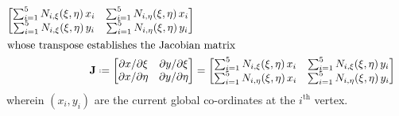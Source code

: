 \begin{subequations}
\begin{align}
\begin{bmatrix}
	\sum\nolimits_{i=1}^5 N_{i,\xi} (\xi,\eta) \, x_i & \sum\nolimits_{i=1}^5 N_{i,\eta} (\xi,\eta) \, x_i \\
	\sum\nolimits_{i=1}^5 N_{i,\xi} (\xi,\eta) \, y_i & \sum\nolimits_{i=1}^5 N_{i,\eta} (\xi,\eta) \, y_i
	\end{bmatrix}
	\label{currentGradients} \\
    \intertext{whose transpose establishes the Jacobian matrix}
    \mathbf{J} \defeq \begin{bmatrix}
    \partial x / \partial\xi & \partial y / \partial\xi \\
    \partial x / \partial\eta & \partial y / \partial\eta
    \end{bmatrix} & = 
    \begin{bmatrix}
    \sum\nolimits_{i=1}^5 N_{i,\xi} (\xi,\eta) \, x_i & \sum\nolimits_{i=1}^5 N_{i,\xi} (\xi,\eta) \, y_i \\
    \sum\nolimits_{i=1}^5 N_{i,\eta} (\xi,\eta) \, x_i & \sum\nolimits_{i=1}^5 N_{i,\eta} (\xi,\eta) \, y_i
    \end{bmatrix}
    \label{JacobianMtx2D}
	\end{align}
\end{subequations}
wherein $(x_i, y_i)$ are the current global co-ordinates at the $i^{\mathrm{th}}$ vertex.

